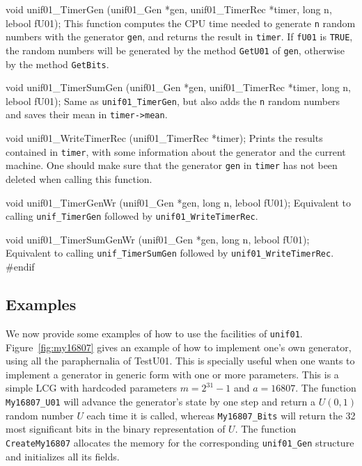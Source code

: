 void unif01_TimerGen (unif01_Gen *gen, unif01_TimerRec *timer, long n,
                      lebool fU01);
\endcode
 \tab
 This function computes the CPU time needed to generate
%
  {\tt n} random numbers with the generator {\tt gen},
  and returns the result in {\tt timer}. If {\tt fU01} is  {\tt TRUE},
  the random numbers will be generated by the method {\tt GetU01} of 
  {\tt gen}, otherwise by the
  method  {\tt GetBits}.
 \endtab
\code


void unif01_TimerSumGen (unif01_Gen *gen, unif01_TimerRec *timer, long n,
                         lebool fU01);
\endcode
 \tab
  Same as {\tt unif01\_TimerGen}, but also adds the {\tt n} random
  numbers and saves their mean in {\tt timer->mean}.
 \endtab
\code


void unif01_WriteTimerRec (unif01_TimerRec *timer);
\endcode
 \tab
  Prints the results contained in {\tt timer}, with some information
  about the generator and the current machine. One should make sure that the
  generator {\tt gen} in {\tt timer} has not been deleted when
  calling this function. 
 \endtab
\code


void unif01_TimerGenWr (unif01_Gen *gen, long n, lebool fU01);
\endcode
 \tab
  Equivalent to calling {\tt unif\_TimerGen} followed by 
  {\tt unif01\_WriteTimerRec}. 
 \endtab
\code


void unif01_TimerSumGenWr (unif01_Gen *gen, long n, lebool fU01);
\endcode
 \tab
  Equivalent to calling {\tt unif\_TimerSumGen} followed by 
  {\tt unif01\_WriteTimerRec}. 
 \endtab
\code
\hide
#endif
\endhide
\endcode


\subsection*{Examples}

We now provide some examples of how to use the facilities of {\tt unif01}.
Figure~\ref{fig:my16807} gives an example of how to implement one's own
generator, using all the paraphernalia of TestU01. This is specially
useful when one wants to implement a generator in generic form with
one or more parameters.
 This is a simple LCG with hardcoded parameters $m=2^{31}-1$ 
and $a = 16807$.
The function {\tt My16807\_U01} will advance the generator's state
by one step and return a $U(0,1)$ random number $U$ each time it is
called, whereas {\tt My16807\_Bits} will return the 32 most significant
bits in the binary representation of $U$.
The function {\tt CreateMy16807} allocates the memory for the corresponding
{\tt unif01\_Gen} structure and initializes all its fields.



